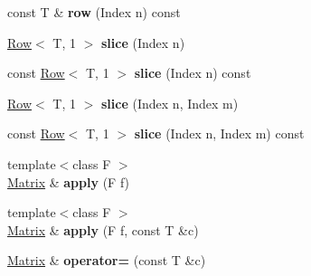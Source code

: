 \begin{DoxyCompactItemize}
\item 
const T \& {\bfseries row} (Index n) const \hypertarget{classcpt_1_1Matrix_3_01T_00_011_01_4_a6010a9bdfbdfac2795e9ce2a2244744b}{}\label{classcpt_1_1Matrix_3_01T_00_011_01_4_a6010a9bdfbdfac2795e9ce2a2244744b}

\item 
\hyperlink{classcpt_1_1Row}{Row}$<$ T, 1 $>$ {\bfseries slice} (Index n)\hypertarget{classcpt_1_1Matrix_3_01T_00_011_01_4_a79c39ab4c2f0c44268f66e2b337a5f54}{}\label{classcpt_1_1Matrix_3_01T_00_011_01_4_a79c39ab4c2f0c44268f66e2b337a5f54}

\item 
const \hyperlink{classcpt_1_1Row}{Row}$<$ T, 1 $>$ {\bfseries slice} (Index n) const \hypertarget{classcpt_1_1Matrix_3_01T_00_011_01_4_a62c3a919fff5d2b745cb7ef587e58229}{}\label{classcpt_1_1Matrix_3_01T_00_011_01_4_a62c3a919fff5d2b745cb7ef587e58229}

\item 
\hyperlink{classcpt_1_1Row}{Row}$<$ T, 1 $>$ {\bfseries slice} (Index n, Index m)\hypertarget{classcpt_1_1Matrix_3_01T_00_011_01_4_a24da19af10925740d952158b36725ce2}{}\label{classcpt_1_1Matrix_3_01T_00_011_01_4_a24da19af10925740d952158b36725ce2}

\item 
const \hyperlink{classcpt_1_1Row}{Row}$<$ T, 1 $>$ {\bfseries slice} (Index n, Index m) const \hypertarget{classcpt_1_1Matrix_3_01T_00_011_01_4_a02cd28d4974f225be35f6a0a07842385}{}\label{classcpt_1_1Matrix_3_01T_00_011_01_4_a02cd28d4974f225be35f6a0a07842385}

\item 
{\footnotesize template$<$class F $>$ }\\\hyperlink{classcpt_1_1Matrix}{Matrix} \& {\bfseries apply} (F f)\hypertarget{classcpt_1_1Matrix_3_01T_00_011_01_4_acdc77aade520c059db1c8d4975d13721}{}\label{classcpt_1_1Matrix_3_01T_00_011_01_4_acdc77aade520c059db1c8d4975d13721}

\item 
{\footnotesize template$<$class F $>$ }\\\hyperlink{classcpt_1_1Matrix}{Matrix} \& {\bfseries apply} (F f, const T \&c)\hypertarget{classcpt_1_1Matrix_3_01T_00_011_01_4_aa6b83815fab97876f54f317cea83d6c0}{}\label{classcpt_1_1Matrix_3_01T_00_011_01_4_aa6b83815fab97876f54f317cea83d6c0}

\item 
\hyperlink{classcpt_1_1Matrix}{Matrix} \& {\bfseries operator=} (const T \&c)\hypertarget{classcpt_1_1Matrix_3_01T_00_011_01_4_aee170e7e675eb1d42494d50d29f5416f}{}\label{classcpt_1_1Matrix_3_01T_00_011_01_4_aee170e7e675eb1d42494d50d29f5416f}


\end{DoxyCompactItemize}
